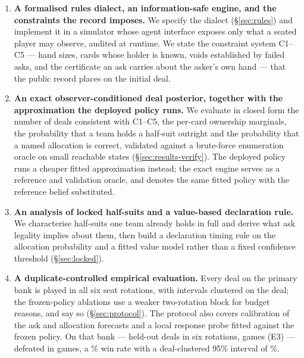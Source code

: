 \begin{enumerate}
  \item \textbf{A formalised rules dialect, an information-safe engine, and the
        constraints the record imposes.} We specify the dialect
        (\S\ref{sec:rules}) and implement it in a simulator whose agent interface
        exposes only what a seated player may observe, audited at runtime. We
        state the constraint system C1--C5 --- hand sizes, cards whose holder is
        known, voids established by failed asks, and the certificate an ask
        carries about the asker's own hand --- that the public record places on
        the initial deal.
  \item \textbf{An exact observer-conditioned deal posterior, together with the
        approximation the deployed policy runs.} We evaluate in closed form the
        number of deals consistent with C1--C5, the per-card ownership marginals,
        the probability that a team holds a half-suit outright and the
        probability that a named allocation is correct, validated against a
        brute-force enumeration oracle on small reachable states
        (\S\ref{sec:results-verify}). The deployed \vfast{} policy runs a cheaper
        fitted approximation instead; the exact engine serves as a reference and
        validation oracle, and \vblock{} denotes the same fitted policy with the
        reference belief substituted.
  \item \textbf{An analysis of locked half-suits and a value-based declaration
        rule.} We characterise half-suits one team already holds in full and
        derive what ask legality implies about them, then build a declaration
        timing rule on the allocation probability and a fitted value model rather
        than a fixed confidence threshold (\S\ref{sec:locked}).
  \item \textbf{A duplicate-controlled empirical evaluation.} Every deal on the
        primary bank is played in all six seat rotations, with intervals
        clustered on the deal; the frozen-policy ablations use a weaker
        two-rotation block for budget reasons, and say so (\S\ref{sec:protocol}).
        The protocol also covers calibration of the ask and allocation forecasts
        and a local response probe fitted against the frozen policy. On that bank
        --- \numHtHDeals{} held-out deals in six rotations, \numHtHGames{} games
        (E3) --- \vfast{} defeated \vthree{} in \numVsVthreeWins{} games, a
        \numVsVthree\% win rate with a deal-clustered 95\% interval of
        \numVsVthreeCI\%.
\end{enumerate}

